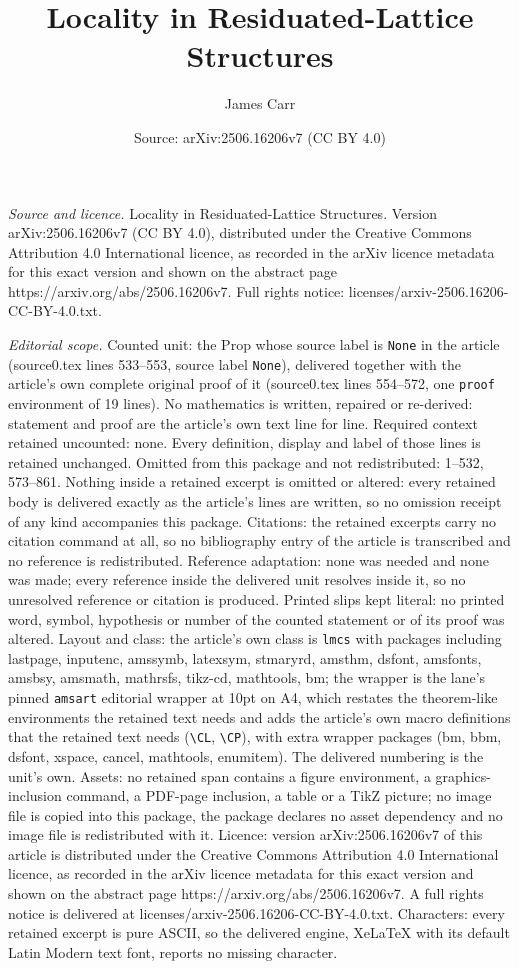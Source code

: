 \documentclass[10pt,a4paper]{amsart}
\title[Locality in Residuated-Lattice Structures]{Locality in Residuated-Lattice Structures}
\author{James Carr}
\date{Source: arXiv:2506.16206v7 (CC BY 4.0)}
\begin{document}
\maketitle

\noindent\emph{Source and licence.} Locality in Residuated-Lattice Structures. Version arXiv:2506.16206v7 (CC BY 4.0), distributed under the Creative Commons Attribution 4.0 International licence, as recorded in the arXiv licence metadata for this exact version and shown on the abstract page https://arxiv.org/abs/2506.16206v7. Full rights notice: licenses/arxiv-2506.16206-CC-BY-4.0.txt.\par\smallskip

\noindent\textit{Editorial scope.} Counted unit: the Prop whose source label is \texttt{None} in the article (source0.tex lines 533--553, source label \texttt{None}), delivered together with the article's own complete original proof of it (source0.tex lines 554--572, one \texttt{proof} environment of 19 lines). No mathematics is written, repaired or re-derived: statement and proof are the article's own text line for line. Required context retained uncounted: none. Every definition, display and label of those lines is retained unchanged. Omitted from this package and not redistributed: 1--532, 573--861. Nothing inside a retained excerpt is omitted or altered: every retained body is delivered exactly as the article's lines are written, so no omission receipt of any kind accompanies this package. Citations: the retained excerpts carry no citation command at all, so no bibliography entry of the article is transcribed and no reference is redistributed. Reference adaptation: none was needed and none was made; every reference inside the delivered unit resolves inside it, so no unresolved reference or citation is produced. Printed slips kept literal: no printed word, symbol, hypothesis or number of the counted statement or of its proof was altered. Layout and class: the article's own class is \texttt{lmcs} with packages including lastpage, inputenc, amssymb, latexsym, stmaryrd, amsthm, dsfont, amsfonts, amsbsy, amsmath, mathrsfs, tikz-cd, mathtools, bm; the wrapper is the lane's pinned \texttt{amsart} editorial wrapper at 10pt on A4, which restates the theorem-like environments the retained text needs and adds the article's own macro definitions that the retained text needs (\texttt{\textbackslash CL}, \texttt{\textbackslash CP}), with extra wrapper packages (bm, bbm, dsfont, xspace, cancel, mathtools, enumitem). The delivered numbering is the unit's own. Assets: no retained span contains a figure environment, a graphics-inclusion command, a PDF-page inclusion, a table or a TikZ picture; no image file is copied into this package, the package declares no asset dependency and no image file is redistributed with it. Licence: version arXiv:2506.16206v7 of this article is distributed under the Creative Commons Attribution 4.0 International licence, as recorded in the arXiv licence metadata for this exact version and shown on the abstract page https://arxiv.org/abs/2506.16206v7. A full rights notice is delivered at licenses/arxiv-2506.16206-CC-BY-4.0.txt. Characters: every retained excerpt is pure ASCII, so the delivered engine, XeLaTeX with its default Latin Modern text font, reports no missing character.
\end{document}

